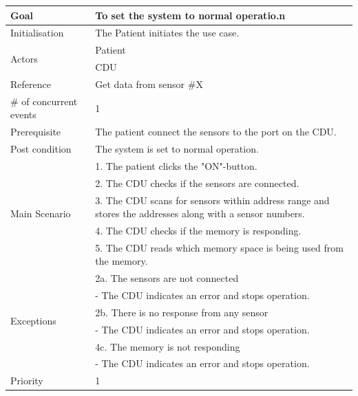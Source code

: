 \begin{table}[H]
	\centering
	\begin{tabular}{|l|p{10cm}|}
	\hline
	Goal 							& To set the system to normal operatio.n \\ \hline
	Initialisation 					& The Patient initiates the use case. \\ \hline
	\multirow{2}{*}{Actors} 		& Patient \\ 
									& CDU \\ \hline
	Reference 						& Get data from sensor \#X \\ \hline
	\# of concurrent events 		& 1 \\ \hline
	Prerequisite  					& The patient connect the sensors to the port on the CDU. \\ \hline
	Post condition 					& The system is set to normal operation. \\ \hline
	\multirow{5}{*}{Main Scenario} 	& 1. The patient clicks the  "ON"-button. \\
	& 2. The CDU checks if the sensors are connected.\\
	& 3. The CDU scans for sensors within address range and stores the addresses along with a sensor numbers.\\ 
	& 4. The CDU checks if the memory is responding.\\
	& 5. The CDU reads which memory space is being used from the memory.\\ \hline
	\multirow{6}{*}{Exceptions} & 2a. The sensors are not connected \\ 
								& - The CDU indicates an error and stops operation.\\											& 2b. There is no response from any sensor\\
								& - The CDU indicates an error and stops operation. \\
								& 4c. The memory is not responding\\
								& - The CDU indicates an error and stops operation. \\ 
								\hline
	Priority					& 1\\\hline
	\end{tabular}
\end{table}

